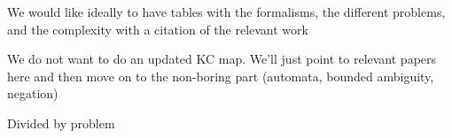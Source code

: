 We would like ideally to have tables with the formalisms, the different
problems, and the complexity with a citation of the relevant work

We do not want to do an updated KC map. We'll just point to relevant papers here
and then move on to the non-boring part (automata, bounded ambiguity, negation)

Divided by problem

